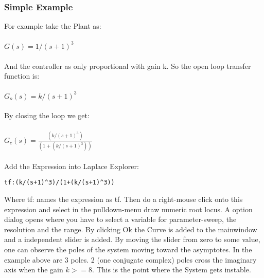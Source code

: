 \documentclass[a4paper,12pt]{article}
\begin{document}
\subsubsection{Simple Example}
For example take the Plant as:\\\\
$G(s)=1/(s+1)^3$\\\\
And the controller as only proportional with gain k. So the open loop transfer function is:\\\\
$G_o(s)=k/(s+1)^3$\\\\
By closing the loop we get:\\\\
$G_c(s)=\frac{(k/(s+1)^3)}{(1+(k/(s+1)^3))}$\\\\
Add the Expression into Laplace Explorer:
\begin{lstlisting}
tf:(k/(s+1)^3)/(1+(k/(s+1)^3))
\end{lstlisting}
Where tf: names the expression as tf.
Then do a right-mouse click onto this expression and select in the pulldown-menu draw 
numeric root locus. A option dialog opens where you have to select a variable for 
parameter-sweep, the resolution and the range. By clicking Ok the Curve is added to the mainwindow
and a independent slider is added. By moving the slider from zero to some value, one can observe
the poles of the system moving toward the asymptotes. In the example above are 3 poles. 2 
(one conjugate complex) poles cross the imaginary axis when the gain $k>=8$. This is the point where the
System gets instable.
\end{document}
